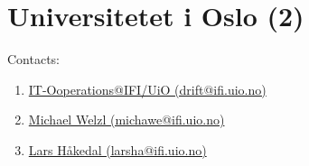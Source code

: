 \section{Universitetet i Oslo (2)}
\label{sec:UiO}

Contacts:\begin{enumerate}
 \item {}\href{mailto:drift@ifi.uio.no}{IT-Ooperations@IFI/UiO (drift@ifi.uio.no)}
 \item {}\href{mailto:michawe@ifi.uio.no}{Michael Welzl (michawe@ifi.uio.no)}
 \item {}\href{mailto:larsha@ifi.uio.no}{Lars Håkedal (larsha@ifi.uio.no)}
\end{enumerate}

